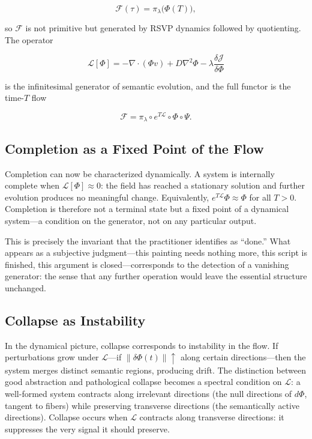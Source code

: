 \documentclass[11pt, twoside]{article}
\theoremstyle{plain}
\theoremstyle{definition}
\theoremstyle{remark}
\begin{document}
\[
\mathcal{F}(\tau) = \pi_\lambda\big(\Phi(T)\big),
\]

so $\mathcal{F}$ is not primitive but generated by RSVP dynamics followed by quotienting. The operator

\[
\mathcal{L}[\Phi] = -\nabla \cdot (\Phi v) + D \nabla^2 \Phi - \lambda \frac{\delta \mathcal{J}}{\delta \Phi}
\]

is the infinitesimal generator of semantic evolution, and the full functor is the time-$T$ flow

\[
\mathcal{F} = \pi_\lambda \circ e^{T\mathcal{L}} \circ \Phi \circ \Psi.
\]

\subsection{Completion as a Fixed Point of the Flow}

Completion can now be characterized dynamically. A system is internally complete when $\mathcal{L}[\Phi] \approx 0$: the field has reached a stationary solution and further evolution produces no meaningful change. Equivalently, $e^{T\mathcal{L}} \Phi \approx \Phi$ for all $T > 0$. Completion is therefore not a terminal state but a fixed point of a dynamical system---a condition on the generator, not on any particular output.

This is precisely the invariant that the practitioner identifies as ``done.'' What appears as a subjective judgment---this painting needs nothing more, this script is finished, this argument is closed---corresponds to the detection of a vanishing generator: the sense that any further operation would leave the essential structure unchanged.

\subsection{Collapse as Instability}

In the dynamical picture, collapse corresponds to instability in the flow. If perturbations grow under $\mathcal{L}$---if $\|\delta\Phi(t)\| \uparrow$ along certain directions---then the system merges distinct semantic regions, producing drift. The distinction between good abstraction and pathological collapse becomes a spectral condition on $\mathcal{L}$: a well-formed system contracts along irrelevant directions (the null directions of $d\Phi$, tangent to fibers) while preserving transverse directions (the semantically active directions). Collapse occurs when $\mathcal{L}$ contracts along transverse directions: it suppresses the very signal it should preserve.
\end{document}
